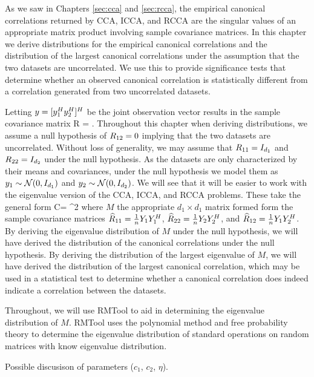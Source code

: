 As we saw in Chapters \ref{sec:cca} and \ref{sec:rcca}, the empirical canonical
correlations returned by CCA, ICCA, and RCCA are the singular values of an appropriate
matrix product involving sample covariance matrices. In this chapter we derive
distributions for the empirical canonical correlations and the distribution of the largest
canonical correlations under the assumption that the two datasets are uncorrelated. We use
this to provide significance tests that determine whether an observed canonical
correlation is statistically different from a correlation generated from two uncorrelated
datasets.

Letting $y=[y_1^H y_2^H]^H$
be the joint observation vector results in the sample covariance matrix
\be
R = .
\ee
Throughout this chapter when deriving distributions, we assume a null hypothesis of
$R_{12}=0$ implying that the two datasets are uncorrelated. Without loss of generality, we
may assume that $R_{11} = I_{d_1}$ and $R_{22} = I_{d_2}$ under the null hypothesis. As the
datasets are only characterized by their means and covariances, under the null hypothesis
we model them as $y_1\sim\mathcal{N}(0,I_{d_1})$ and $y_2\sim\mathcal{N}(0,I_{d_2})$. We
will see that it will be easier to work with the eigenvalue version of the CCA, ICCA, and
RCCA problems. These take the general form
\be
C\xIhat = \rho^2\xIhat
\ee
where $M$ the appropriate $d_1\times d_1$ matrix formed form the sample covariance
matrices $\widehat{R}_{11} =\frac{1}{n}Y_1Y_1^H$, $\widehat{R}_{22} =\frac{1}{n}Y_2Y_2^H$, and $\widehat{R}_{12}
=\frac{1}{n}Y_1Y_2^H$. By deriving the eigenvalue distribution of $M$ under the null
hypothesis, we will have derived the distribution of the canonical correlations under the
null hypothesis. By deriving the distribution of the largest eigenvalue of $M$, we will
have derived the distribution of the largest canonical correlation, which may be used in a
statistical test to determine whether a canonical correlation does indeed indicate a
correlation between the datasets. 

Throughout, we will use RMTool \cite{rao2008polynomial} to aid in determining
the eigenvalue distribution of $M$. RMTool uses the polynomial method and free probability
theory to determine the eigenvalue distribution of standard operations on random matrices
with know eigenvalue distribution.

Possible discusison of parameters ($c_1$, $c_2$, $\eta$).

